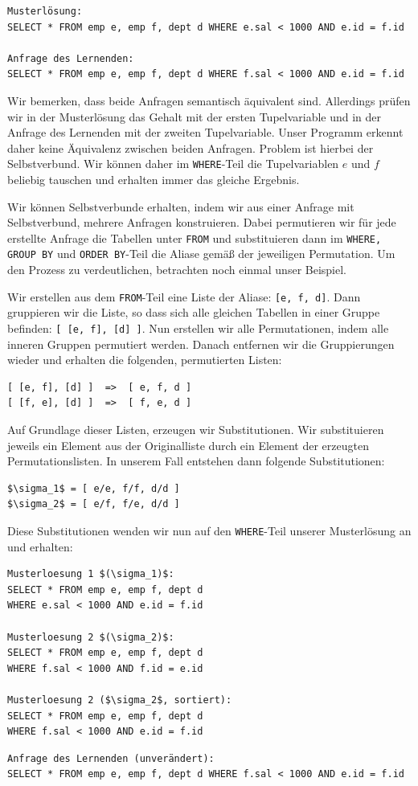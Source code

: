 \begin{verbatim}
Musterlösung:
SELECT * FROM emp e, emp f, dept d WHERE e.sal < 1000 AND e.id = f.id

Anfrage des Lernenden:
SELECT * FROM emp e, emp f, dept d WHERE f.sal < 1000 AND e.id = f.id
\end{verbatim}

Wir bemerken, dass beide Anfragen semantisch äquivalent sind. Allerdings prüfen wir in der Musterlösung das Gehalt mit der ersten Tupelvariable und in der Anfrage des Lernenden mit der zweiten Tupelvariable. Unser Programm erkennt daher keine Äquivalenz zwischen beiden Anfragen. Problem ist hierbei der Selbstverbund. Wir können daher im \verb|WHERE|-Teil die Tupelvariablen $e$ und $f$ beliebig tauschen und erhalten immer das gleiche Ergebnis. 

Wir können Selbstverbunde erhalten, indem wir aus einer Anfrage mit Selbstverbund, mehrere Anfragen konstruieren. Dabei permutieren wir für jede erstellte Anfrage die Tabellen unter \verb|FROM| und substituieren dann im \verb|WHERE, GROUP BY| und \verb|ORDER BY|-Teil die Aliase gemäß der jeweiligen Permutation. Um den Prozess zu verdeutlichen, betrachten noch einmal unser Beispiel. 

Wir erstellen aus dem \verb|FROM|-Teil eine Liste der Aliase: \verb|[e, f, d]|. Dann gruppieren wir die Liste, so dass sich alle gleichen Tabellen in einer Gruppe befinden: \verb|[ [e, f], [d] ]|. Nun erstellen wir alle Permutationen, indem alle inneren Gruppen permutiert werden. Danach entfernen wir die Gruppierungen wieder und erhalten die folgenden, permutierten Listen:
\begin{verbatim}
[ [e, f], [d] ]  =>  [ e, f, d ]
[ [f, e], [d] ]  =>  [ f, e, d ]
\end{verbatim}

Auf Grundlage dieser Listen, erzeugen wir Substitutionen. Wir substituieren jeweils ein Element aus der Originalliste durch ein Element der erzeugten Permutationslisten. In unserem Fall entstehen dann folgende Substitutionen:

\begin{lstlisting}[mathescape]
$\sigma_1$ = [ e/e, f/f, d/d ]
$\sigma_2$ = [ e/f, f/e, d/d ]
\end{lstlisting}

Diese Substitutionen wenden wir nun auf den \verb|WHERE|-Teil unserer Musterlösung an und erhalten:

\begin{lstlisting}[mathescape]
Musterloesung 1 $(\sigma_1)$:
SELECT * FROM emp e, emp f, dept d 
WHERE e.sal < 1000 AND e.id = f.id 

Musterloesung 2 $(\sigma_2)$: 
SELECT * FROM emp e, emp f, dept d 
WHERE f.sal < 1000 AND f.id = e.id 

Musterloesung 2 ($\sigma_2$, sortiert): 
SELECT * FROM emp e, emp f, dept d 
WHERE f.sal < 1000 AND e.id = f.id 
\end{lstlisting}
\begin{verbatim}
Anfrage des Lernenden (unverändert):
SELECT * FROM emp e, emp f, dept d WHERE f.sal < 1000 AND e.id = f.id
\end{verbatim}


